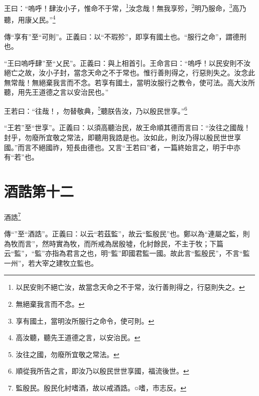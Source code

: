 王曰：“嗚呼！肆汝小子，惟命不于常，\footnote{以民安則不絕亡汝，故當念天命之不于常，汝行善則得之，行惡則失之。}汝念哉！無我享殄，\footnote{無絕棄我言而不念。}明乃服命，\footnote{享有國土，當明汝所服行之命令，使可則。}高乃聽，用康乂民。”\footnote{高汝聽，聽先王道德之言，以安治民。}


{\noindent\zhuan{}\fzbyks 傳“享有”至“可則”。正義曰：以“不瑕殄”，即享有國土也。“服行之命”，謂德刑也。 \par}

{\noindent\shu{}\fzkt “王曰嗚呼肆”至“乂民”。正義曰：與上相首引。王命言曰：“嗚呼！以民安則不汝絕亡之故，汝小子封，當念天命之不于常也。惟行善則得之，行惡則失之。汝念此無常哉！無絕棄我言而不念。若享有國土，當明汝服行之教令，使可法。高大汝所聽，用先王道德之言以安治民也。” \par}

王若曰：“往哉！，勿替敬典，\footnote{汝往之國，勿廢所宜敬之常法。}聽朕告汝，乃以殷民世享。”\footnote{順從我所告之言，即汝乃以殷民世世享國，福流後世。}

{\noindent\shu{}\fzkt “王若”至“世享”。正義曰：以須高聽治民，故王命順其德而言曰：“汝往之國哉！封乎，勿廢所宜敬之常法，即聽用我誥是也。汝如此，則汝乃得以殷民世世享國。”而言不絕國祚，短長由德也。又言“王若曰”者，一篇終始言之，明于中亦有“若”也。 \par}

\section{酒誥第十二}


酒誥\footnote{監殷民。殷民化紂嗜酒，故以戒酒誥。○嗜，巿志反。}

{\noindent\shu{}\fzkt 傳“”至“酒誥”。正義曰：以云“若茲監”，故云“監殷民”也。鄭以為“連屬之監，則為牧而言”，然時實為牧，而所戒為居殷墟，化紂餘民，不主于牧；下篇云“監”，“監”亦指為君言之也，明“監”即國君監一國。故此言“監殷民”，不言“監一州”，若大宰之建牧立監也。 \par}

